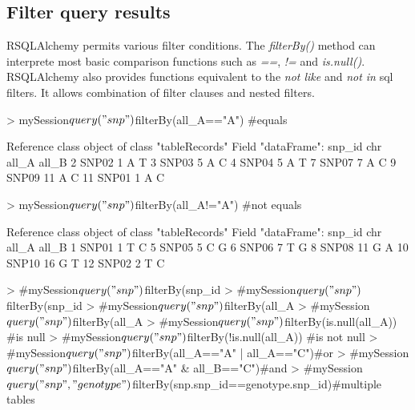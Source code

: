 \documentclass[a4paper,11pt]{article}
\begin{document}
\subsection*{Filter query results}
RSQLAlchemy permits various filter conditions. The \emph{filterBy()} method can interprete most basic comparison functions such as \emph{==}, \emph{!=} and \emph{is.null()}. RSQLAlchemy also provides functions equivalent to the  \emph{not like} and \emph{not in} sql filters. It allows combination of filter clauses and nested filters.

\begin{Schunk}
\begin{Sinput}
> mySession$query("snp")$filterBy(all_A=="A") #equals
\end{Sinput}
\begin{Soutput}
Reference class object of class "tableRecords"
Field "dataFrame":
   snp_id chr all_A all_B
2   SNP02   1     A     T
3   SNP03   5     A     C
4   SNP04   5     A     T
7   SNP07   7     A     C
9   SNP09  11     A     C
11  SNP01   1     A     C
\end{Soutput}
\begin{Sinput}
> mySession$query("snp")$filterBy(all_A!="A") #not equals
\end{Sinput}
\begin{Soutput}
Reference class object of class "tableRecords"
Field "dataFrame":
   snp_id chr all_A all_B
1   SNP01   1     T     C
5   SNP05   5     C     G
6   SNP06   7     T     G
8   SNP08  11     G     A
10  SNP10  16     G     T
12  SNP02   2     T     C
\end{Soutput}
\begin{Sinput}
> #mySession$query("snp")$filterBy(snp_id %like% "1") #like
> #mySession$query("snp")$filterBy(snp_id %!like% "1") #not like
> #mySession$query("snp")$filterBy(all_A %in% c("A","C")) #in
> #mySession$query("snp")$filterBy(all_A %!in% c("A","C")) #not in
> #mySession$query("snp")$filterBy(is.null(all_A)) #is null
> #mySession$query("snp")$filterBy(!is.null(all_A)) #is not null
> #mySession$query("snp")$filterBy(all_A=="A" | all_A=="C")#or
> #mySession$query("snp")$filterBy(all_A=="A" & all_B=="C")#and
> #mySession$query("snp","genotype")$filterBy(snp.snp_id==genotype.snp_id)#multiple tables
\end{Sinput}
\end{Schunk}
\end{document}
